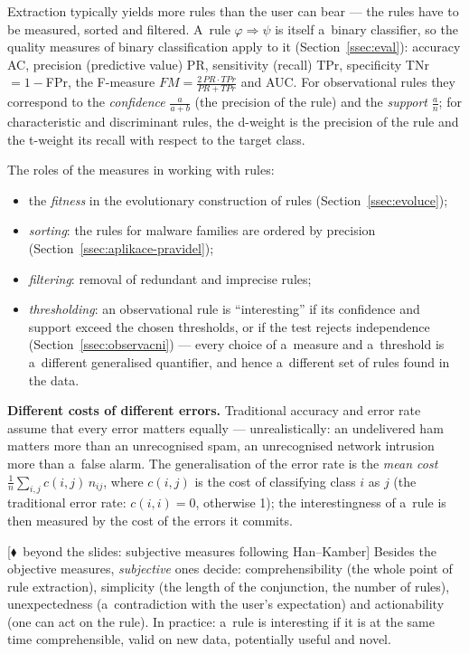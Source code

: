\documentclass[11pt,a4paper]{article}
\theoremstyle{definition}
\providecommand{\uv}[1]{``#1''}
\newcommand{\mimoq}[1]{\textcolor{markcol}{\textsf{\footnotesize[$\blacklozenge$~beyond the slides: #1]}}}
\begin{document}
Extraction typically yields more rules than the user can bear --- the rules have to be
measured, sorted and filtered. A~rule $\varphi\Rightarrow\psi$ is itself a~binary
classifier, so the quality measures of binary classification apply to it
(Section~\ref{ssec:eval}): accuracy AC, precision (predictive value) PR, sensitivity
(recall) TPr, specificity TNr $=1-{}$FPr, the F-measure
$FM=\frac{2\,PR\cdot TPr}{PR+TPr}$ and AUC. For observational rules they correspond to
the \emph{confidence} $\tfrac{a}{a+b}$ (the precision of the rule) and the
\emph{support} $\tfrac{a}{n}$; for characteristic and discriminant rules, the d-weight
is the precision of the rule and the t-weight its recall with respect to the target
class.

The roles of the measures in working with rules:
\begin{itemize}
\item the \emph{fitness} in the evolutionary construction of rules
      (Section~\ref{ssec:evoluce});
\item \emph{sorting}: the rules for malware families are ordered by precision
      (Section~\ref{ssec:aplikace-pravidel});
\item \emph{filtering}: removal of redundant and imprecise rules;
\item \emph{thresholding}: an observational rule is \uv{interesting} if its confidence
      and support exceed the chosen thresholds, or if the test rejects independence
      (Section~\ref{ssec:observacni}) --- every choice of a~measure and a~threshold is
      a~different generalised quantifier, and hence a~different set of rules found in
      the data.
\end{itemize}

\textbf{Different costs of different errors.} Traditional accuracy and error rate
assume that every error matters equally --- unrealistically: an undelivered ham
matters more than an unrecognised spam, an unrecognised network intrusion more than
a~false alarm. The generalisation of the error rate is the \emph{mean cost}
$\frac1n\sum_{i,j}c(i,j)\,n_{ij}$, where $c(i,j)$ is the cost of classifying class $i$
as $j$ (the traditional error rate: $c(i,i)=0$, otherwise 1); the interestingness of
a~rule is then measured by the cost of the errors it commits.

\mimoq{subjective measures following Han--Kamber} Besides the objective measures,
\emph{subjective} ones decide: comprehensibility (the whole point of rule extraction),
simplicity (the length of the conjunction, the number of rules), unexpectedness
(a~contradiction with the user's expectation) and actionability (one can act on the
rule). In practice: a~rule is interesting if it is at the same time comprehensible,
valid on new data, potentially useful and novel.
\end{document}
